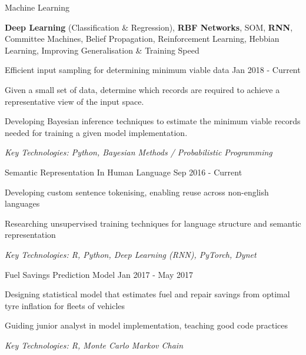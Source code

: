 \documentclass[11pt,article,oneside]{memoir}
\newenvironment{itemize*}{%
  \renewcommand\labelitemi{\textbullet}
  \footnotesize
  \begin{itemize}%
    \setlength{\itemsep}{0pt}}%
  {\end{itemize}
}
\begin{document}
\ind Machine Learning 

\ind \hspace{0.354in} \footnotesize \textbf{Deep Learning} (Classification \& Regression), \textbf{RBF Networks}, SOM, \textbf{RNN}, Committee Machines,
Belief Propagation, Reinforcement Learning, Hebbian Learning, Improving Generalisation \& Training Speed \normalsize

\bigskip
 

\normalsize
\medskip
\ind Efficient input sampling for determining minimum viable data \hfill Jan 2018 - Current
\begin{itemize*}
  \item Given a small set of data, determine which records are required to achieve a representative view of the input space.
  \item Developing Bayesian inference techniques to estimate the minimum viable records needed for training a given model implementation.
\end{itemize*}
\ind \hspace{0.35in} \footnotesize \emph{Key Technologies: Python, Bayesian Methods / Probabilistic Programming}

\normalsize
\medskip
\ind Semantic Representation In Human Language \hfill Sep 2016 - Current
\begin{itemize*}
  \item Developing custom sentence tokenising, enabling reuse across non-english languages
  \item Researching unsupervised training techniques for language structure and semantic representation
\end{itemize*}
\ind \hspace{0.35in} \footnotesize \emph{Key Technologies: R, Python, Deep Learning (RNN), PyTorch, Dynet}

\normalsize
\medskip
\ind Fuel Savings Prediction Model \hfill Jan 2017 - May 2017
\begin{itemize*}
  \item Designing statistical model that estimates fuel and repair savings from optimal tyre inflation for fleets of vehicles
  \item Guiding junior analyst in model implementation, teaching good code practices
\end{itemize*}
\ind \hspace{0.35in} \footnotesize \emph{Key Technologies: R, Monte Carlo Markov Chain}
\end{document}
